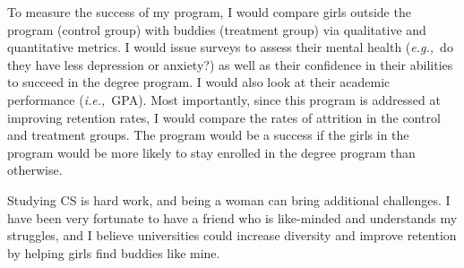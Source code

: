 \documentclass{article}
\newcommand{\ie}{{\em i.e.,}~}
\newcommand{\eg}{{\em e.g.,}~}
\begin{document}
To measure the success of my program, I would compare girls outside the program (control group) with buddies (treatment group) via qualitative and quantitative metrics.
I would issue surveys to assess their mental health (\eg do they have less depression or anxiety?) as well as their confidence in their abilities to succeed in the degree program.
I would also look at their academic performance (\ie GPA).
Most importantly, since this program is addressed at improving retention rates, I would compare the rates of attrition in the control and treatment groups.
The program would be a success if the girls in the program would be more likely to stay enrolled in the degree program than otherwise.

Studying CS is hard work, and being a woman can bring additional challenges.
I have been very fortunate to have a friend who is like-minded and understands my struggles, and I believe universities could increase diversity and improve retention by helping girls find buddies like mine.
\end{document}

